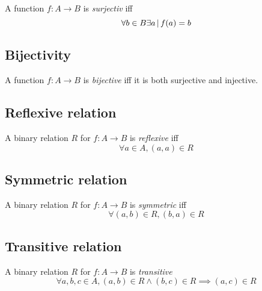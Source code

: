 \documentclass{article}
\begin{document}
A function \(f:A\to B\) is \textit{surjectiv} iff
\[
    \forall b \in B \exists a \,|\, f(a)=b
\]

\subsection{Bijectivity}

A function \(f:A\to B\) is \textit{bijective} iff
it is both surjective and injective.

\subsection{Reflexive relation}

A binary relation \(R\) for \(f:A\to B\) is \textit{reflexive}
iff
\[
    \forall a\in A, (a,a) \in R
\]

\subsection{Symmetric relation}

A binary relation \(R\) for \(f:A\to B\) is \textit{symmetric}
iff
\[
    \forall (a,b)\in R, (b,a) \in R
\]

\subsection{Transitive relation}

A binary relation \(R\) for \(f:A\to B\) is \textit{transitive}
\[
    \forall a,b,c \in A, (a,b) \in R \land (b,c) \in R \implies (a,c) \in R 
\]

\pagebreak
\end{document}
